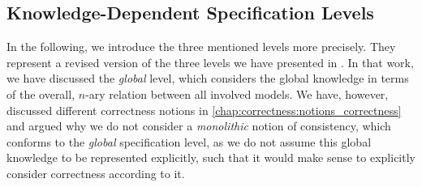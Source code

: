 
\subsection{Knowledge-Dependent Specification Levels}

In the following, we introduce the three mentioned levels more precisely.
They represent a revised version of the three levels we have presented in .
In that work, we have discussed the \emph{global} level, which considers the global knowledge in terms of the overall, $n$-ary relation between all involved models.
We have, however, discussed different correctness notions in \autoref{chap:correctness:notions_correctness} and argued why we do not consider a \emph{monolithic} notion of consistency, which conforms to the \emph{global} specification level, as we do not assume this global knowledge to be represented explicitly, such that it would make sense to explicitly consider correctness according to it.

%    


